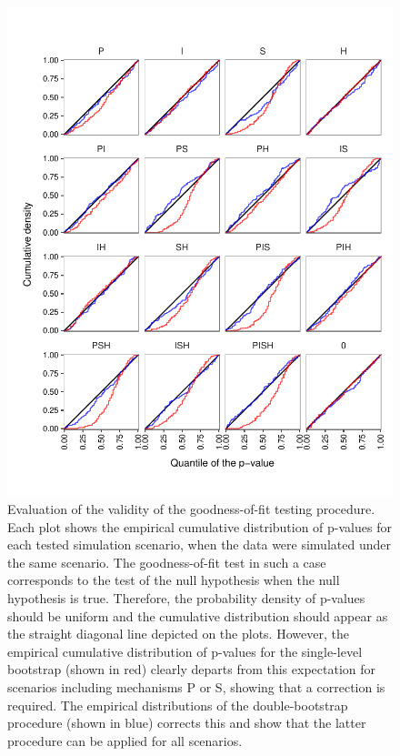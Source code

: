 \documentclass[a4paper]{article}\usepackage[]{graphicx}\usepackage[]{color}
\begin{document}
\begin{figure}[H]
\begin{center}
\includegraphics[width = 0.9\linewidth]{../figures/figS7.pdf}
\end{center}
\caption{Evaluation of the validity of the goodness-of-fit testing procedure. Each plot shows the empirical cumulative distribution of p-values for each tested simulation scenario, when the data were simulated under the same scenario. The goodness-of-fit test in such a case corresponds to the test of the null hypothesis when the null hypothesis is true. Therefore, the probability density of p-values should be uniform and the cumulative distribution should appear as the straight diagonal line depicted on the plots. However, the empirical cumulative distribution of p-values for the single-level bootstrap (shown in red) clearly departs from this expectation for scenarios including mechanisms P or S, showing that a correction is required. The empirical distributions of the double-bootstrap procedure (shown in blue) corrects this and show that the latter procedure can be applied for all scenarios.}
\end{figure}
\end{document}
